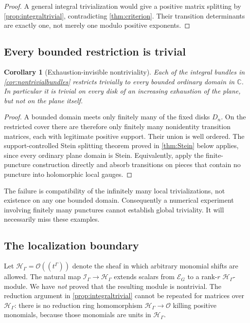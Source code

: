 \documentclass[11pt,letterpaper]{article}
\newtheorem{corollary}[corollary]{Corollary}
\theoremstyle{definition}
\theoremstyle{remark}
\newcommand{\C}{\mathbb C}
\newcommand{\OO}{\mathcal O}
\newcommand{\HH}{\mathscr H_\Gamma}
\newcommand{\II}{\mathscr I_\Gamma}
\numberwithin{equation}{section}
\begin{document}
\begin{proof}
A general integral trivialization would give a positive matrix splitting by \cref{prop:integraltrivial}, contradicting \cref{thm:criterion}. Their transition determinants are exactly one, not merely one modulo positive exponents.
\end{proof}

\subsection{Every bounded restriction is trivial}

\begin{corollary}[Exhaustion-invisible nontriviality]\label{cor:bounded}
Each of the integral bundles in \cref{cor:nontrivialbundles} restricts trivially to every bounded ordinary domain in $\C$. In particular it is trivial on every disk of an increasing exhaustion of the plane, but not on the plane itself.
\end{corollary}

\begin{proof}
A bounded domain meets only finitely many of the fixed disks $D_n$. On the restricted cover there are therefore only finitely many nonidentity transition matrices, each with legitimate positive support. Their union is well ordered. The support-controlled Stein splitting theorem proved in \cref{thm:Stein} below applies, since every ordinary plane domain is Stein. Equivalently, apply the finite-puncture construction directly and absorb transitions on pieces that contain no puncture into holomorphic local gauges.
\end{proof}

The failure is compatibility of the infinitely many local trivializations, not existence on any one bounded domain. Consequently a numerical experiment involving finitely many punctures cannot establish global triviality. It will necessarily miss these examples.

\subsection{The localization boundary}

Let $\HH=\OO((t^\Gamma))$ denote the sheaf in which arbitrary monomial shifts are allowed. The natural map $\II\to\HH$ extends scalars from $\mathcal E_G$ to a rank-$r$ $\HH$-module. We have \emph{not} proved that the resulting module is nontrivial. The reduction argument in \cref{prop:integraltrivial} cannot be repeated for matrices over $\HH$: there is no reduction ring homomorphism $\HH\to\OO$ killing positive monomials, because those monomials are units in $\HH$.
\end{document}
